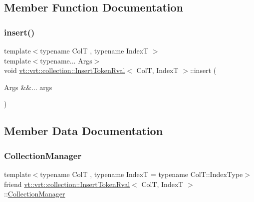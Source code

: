 \subsection{Member Function Documentation}
\mbox{\label{structvt_1_1vrt_1_1collection_1_1_insert_token_rval_a24233cafaa4d9a311c757573e3a61352}} 
\subsubsection{\texorpdfstring{insert()}{insert()}}
{\footnotesize\ttfamily template$<$typename ColT , typename IndexT $>$ \\
template$<$typename... Args$>$ \\
void \hyperlink{structvt_1_1vrt_1_1collection_1_1_insert_token_rval}{vt\+::vrt\+::collection\+::\+Insert\+Token\+Rval}$<$ ColT, IndexT $>$\+::insert (\begin{DoxyParamCaption}\item[{Args \&\&...}]{args }\end{DoxyParamCaption})}



\subsection{Member Data Documentation}
\mbox{\label{structvt_1_1vrt_1_1collection_1_1_insert_token_rval_a10b822803e1ad9860efabbb9d979c842}} 
\subsubsection{\texorpdfstring{Collection\+Manager}{CollectionManager}}
{\footnotesize\ttfamily template$<$typename ColT , typename IndexT  = typename Col\+T\+::\+Index\+Type$>$ \\
friend \hyperlink{structvt_1_1vrt_1_1collection_1_1_insert_token_rval}{vt\+::vrt\+::collection\+::\+Insert\+Token\+Rval}$<$ ColT, IndexT $>$\+::\hyperlink{structvt_1_1vrt_1_1collection_1_1_collection_manager}{Collection\+Manager}}

